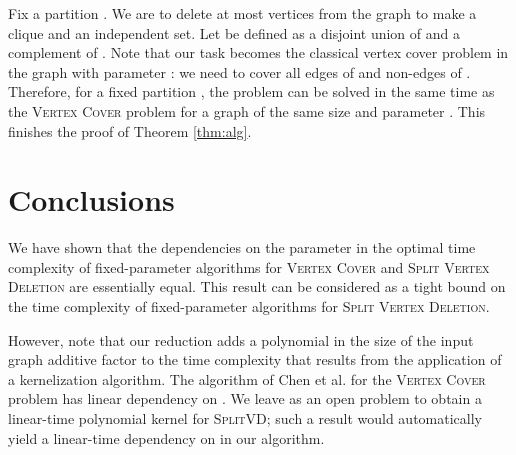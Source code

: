 \documentclass{article}
\newcommand{\splitlong}{\textsc{Split Vertex Deletion}\xspace}
\newcommand{\splitvd}{\textsc{SplitVD}\xspace}
\newcommand{\vertexcover}{\textsc{Vertex Cover}\xspace}
\theoremstyle{definition}
\begin{document}
Fix a partition . We are to delete at most  vertices from the graph 
to make  a clique and  an independent set.
Let  be defined as a disjoint union of  and a complement of .
Note that our task becomes the classical vertex cover problem in the graph  with parameter : we need to
cover all edges of  and non-edges of . Therefore, for a fixed partition ,
the problem can be solved in the same time as the \vertexcover problem for a graph of the same size and parameter .
This finishes the proof of Theorem \ref{thm:alg}.

\section{Conclusions}

We have shown that the dependencies on the parameter  in the optimal time complexity of fixed-parameter algorithms
for \vertexcover and \splitlong are essentially equal.
This result can be considered as a tight bound on the time complexity of fixed-parameter algorithms for \splitlong.

However, note that our reduction adds a polynomial in the size of the input graph additive factor to the time complexity
that results from the application of a kernelization algorithm.
The algorithm of Chen et al. \cite{vc:best} for the \vertexcover problem has linear dependency on .
We leave as an open problem to obtain a linear-time polynomial kernel for \splitvd; such a result would
automatically yield a linear-time dependency on  in our algorithm.



\end{document}
